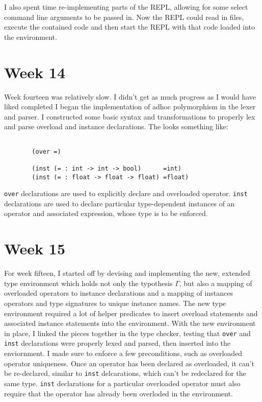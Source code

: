 \documentclass[11pt,a4paper]{article}
\begin{document}
I also spent time re-implementing parts of the REPL, allowing for some select
command line arguments to be passed in. Now the REPL could read in files,
execute the contained code and then start the REPL with that code loaded into
the environment.


\section*{Week 14}

Week fourteen was relatively slow. I didn't get as much progress as I would
have liked completed I began the implementation of adhoc polymorphism in the
lexer and parser. I constructed some basic syntax and transformations to
properly lex and parse overload and instance declarations. The looks something
like:

\begin{figure}[H]
\centering
\begin{verbatim}

  (over =)

  (inst (= : int -> int -> bool)      =int)
  (inst (= : float -> float -> float) =float)
\end{verbatim}
\end{figure}

\verb|over| declarations are used to explicitly declare and overloaded operator.
\verb|inst| declarations are used to declare particular type-dependent
instances of an operator and associated expression, whose type is to be
enforced.


\section*{Week 15}

For week fifteen, I started off by devising and implementing the new, extended
type environment which holds not only the typothesis $\Gamma$, but also a mapping
of overloaded operators to instance declarations and a mapping of instances
operators and type signatures to unique instance names. The new type
environment required a lot of helper predicates to insert overload statements and
associated instance statements into the environment. With the new environment in
place, I linked the pieces together in the type checker, testing that \verb|over|
and \verb|inst| declarations were properly lexed and parsed, then inserted into
the enviornment. I made sure to enforce a few preconditions, such as overloaded
operator uniqueness. Once an operator has been declared as overloaded, it can't be
re-declared, similar to \verb|inst| delcarations, which can't be redeclared for
the same type. \verb|inst| declarations for a particular overloaded operator must
also require that the operator has already been overloded in the environment.
\end{document}
